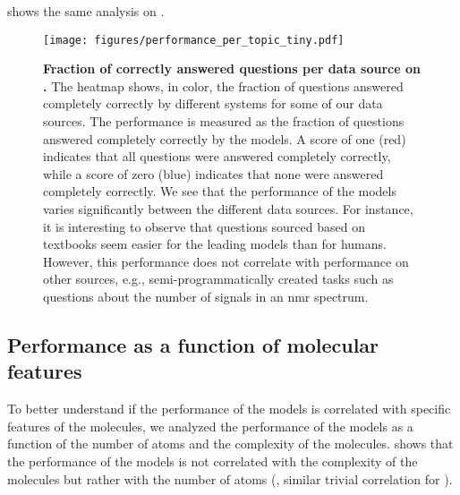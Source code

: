  shows the same analysis on \chembenchmini.


\begin{figure}[htb]
    \centering
    \texttt{[image: figures/performance\_per\_topic\_tiny.pdf]}
    \caption{\textbf{Fraction of  correctly answered questions per data source on \chembenchmini.} The heatmap shows, in color, the fraction of questions answered completely correctly by different systems for some of our data sources. The performance is measured as the fraction of questions answered completely correctly by the models. A score of one (red) indicates that all questions were answered completely correctly, while a score of zero (blue) indicates that none were answered completely correctly.
        We see that the performance of the models varies significantly between the different data sources. For instance, it is interesting to observe that questions sourced based on textbooks seem easier for the leading models than for humans. However, this performance does not correlate with performance on other sources, e.g., semi-programmatically created tasks such as questions about the number of signals in an \gls{nmr} spectrum.
    }
    \label{fig:performance_per_topic_tiny}
\end{figure}





\clearpage

\subsection{Performance as a function of molecular features} \label{sec:molecular_features}
To better understand if the performance of the models is correlated with specific features of the molecules, we analyzed the performance of the models as a function of the number of atoms and the complexity of the molecules.
 shows that the performance of the models is not correlated with the complexity of the molecules but rather with the number of atoms (, similar trivial correlation for ).

